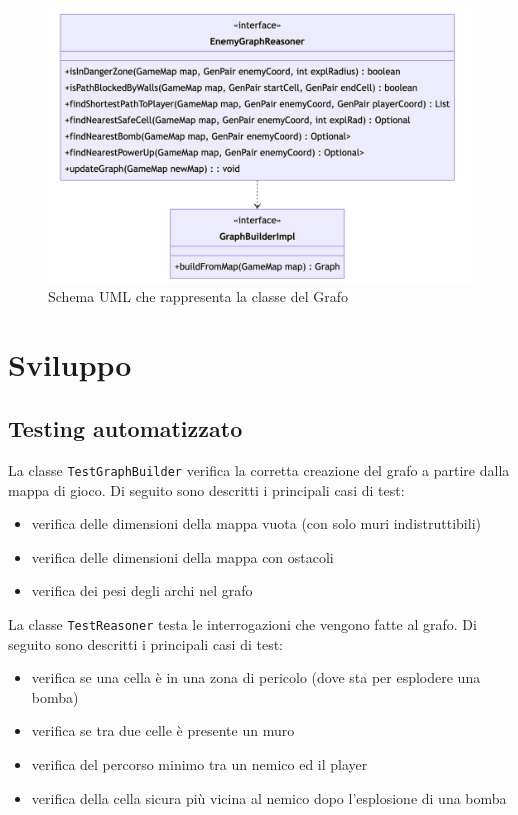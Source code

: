 \documentclass[a4paper,12pt]{report}
\begin{document}
\begin{figure}[h]
\centering{}
\includegraphics[width=\textwidth]{img/enemyGraph.png}
\caption{Schema UML che rappresenta la classe del Grafo}
\end{figure}

\chapter{Sviluppo}
\section{Testing automatizzato}

\par
La classe \texttt{TestGraphBuilder} verifica la corretta creazione del grafo a partire dalla mappa di gioco. Di seguito sono descritti i principali casi di test:
\begin{itemize}
    \item verifica delle dimensioni della mappa vuota (con solo muri indistruttibili)
    \item verifica delle dimensioni della mappa con ostacoli
    \item verifica dei pesi degli archi nel grafo
\end{itemize}

\par
La classe \texttt{TestReasoner} testa le interrogazioni che vengono fatte al grafo. Di seguito sono descritti i principali casi di test:
\begin{itemize}
    \item verifica se una cella è in una zona di pericolo (dove sta per esplodere una bomba)
    \item verifica se tra due celle è presente un muro
    \item verifica del percorso minimo tra un nemico ed il player
    \item verifica della cella sicura più vicina al nemico dopo l’esplosione di una bomba
\end{itemize}
\end{document}

